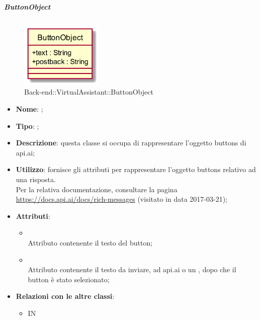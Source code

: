 \hypertarget{ButtonObject_label}{\subparagraph{ButtonObject}}
\begin{figure}[h]
	\centering
	\includegraphics[width=0.35\textwidth,height=\textheight,keepaspectratio]{images/ClassButtonObject.png}
	\caption{Back-end::VirtualAssistant::ButtonObject}
\end{figure}
\begin{itemize}
	\item \textbf{Nome}: ;
	\item \textbf{Tipo}: ;
	\item \textbf{Descrizione}: questa classe si occupa di rappresentare l'oggetto buttons di api.ai;
	\item \textbf{Utilizzo}: fornisce gli attributi per rappresentare l'oggetto buttons relativo ad una risposta. \\
	Per la relativa documentazione, consultare la pagina \url{https://docs.api.ai/docs/rich-messages} (visitato in data 2017-03-21);
	\item \textbf{Attributi}:
	\begin{itemize}
		\item[]  \\
		Attributo contenente il testo del button;
		\item[]  \\
		Attributo contenente il testo da inviare, ad api.ai o un , dopo che il button è stato selezionato;
	\end{itemize}
	\item \textbf{Relazioni con le altre classi}:
	\begin{itemize}
		\item IN \hyperlink{MsgObject_label}{}
	\end{itemize}
\end{itemize}
\FloatBarrier

